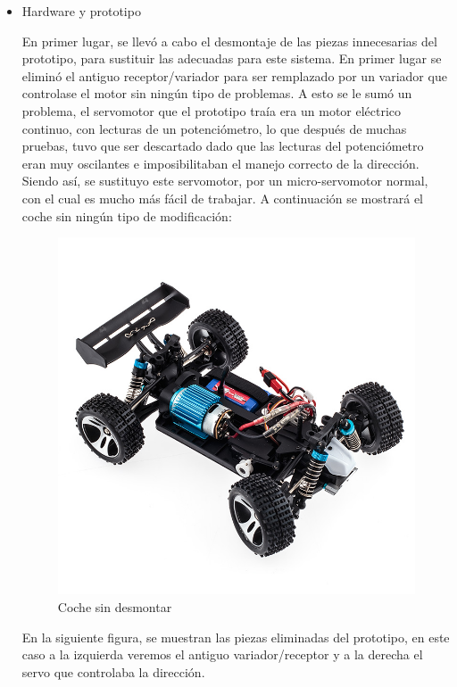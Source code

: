 \documentclass{pclass}
\begin{document}
\begin{itemize}

\item Hardware y prototipo

En primer lugar, se llevó a cabo el desmontaje de las piezas innecesarias del prototipo, para sustituir las adecuadas para este sistema. En primer lugar se eliminó el antiguo receptor/variador para ser remplazado por un variador que controlase el motor sin ningún tipo de problemas. A esto se le sumó un problema, el servomotor que el prototipo traía era un motor eléctrico continuo, con lecturas de un potenciómetro, lo que después de muchas pruebas, tuvo que ser descartado dado que las lecturas del potenciómetro eran muy oscilantes e imposibilitaban el manejo correcto de la dirección. Siendo así, se sustituyo este servomotor, por un micro-servomotor normal, con el cual es mucho más fácil de trabajar.
A continuación se mostrará el coche sin ningún tipo de modificación:

\begin{figure}[H]
  \centering
    \includegraphics[angle=270,width=1.35\textwidth]{img/A959}
  \caption{Coche sin desmontar}
  \label{fig:CocheSin}
\end{figure}

\clearpage
En la siguiente figura, se muestran las piezas eliminadas del prototipo, en este caso a la izquierda veremos el antiguo variador/receptor y a la derecha el servo que controlaba la dirección.


\end{itemize}
\end{document}
